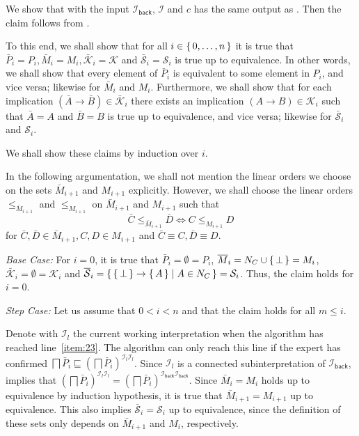 \begin{Proof}
  We show that  with the input
  $\mathcal{I}_{\mathsf{back}}$, $\mathcal{I}$ and $c$ has the same output as
  .  Then the claim follows from
  .

  To this end, we shall show that for all $i \in {\ensuremath{\{\, 0, \dots, n \,\}}}$ it is true that
  $\bar P_{i} = P_{i}, \bar M_{i} = M_{i}, \bar{\mathcal{K}}_{i} = \mathcal{K}$ and
  $\bar{\mathcal{S}}_{i} = \mathcal{S}_{i}$ is true up to equivalence.  In other words, we
  shall show that every element of $\bar P_{i}$ is equivalent to some element in $P_{i}$,
  and vice versa; likewise for $\bar M_{i}$ and $M_{i}$.  Furthermore, we shall show that
  for each implication $(\bar A \to \bar B) \in \bar{\mathcal{K}}_{i}$ there exists an
  implication $(A \to B) \in \mathcal{K}_{i}$ such that $\bar A = A$ and $\bar B = B$ is
  true up to equivalence, and vice versa; likewise for $\bar{\mathcal{S}}_{i}$ and
  $\mathcal{S}_{i}$.

  We shall show these claims by induction over $i$.

  In the following argumentation, we shall not mention the linear orders we choose on the
  sets $\bar M_{i+1}$ and $M_{i+1}$ explicitly.  However, we shall
  choose the linear orders $\leq_{\bar M_{i+1}}$ and $\leq_{M_{i+1}}$ on $\bar M_{i+1}$
  and $M_{i+1}$ such that
  \begin{equation*}
    \bar C \leq_{\bar M_{i+1}} \bar D \iff C \leq_{M_{i+1}} D
  \end{equation*}
  for $\bar C, \bar D \in \bar M_{i+1}, C, D \in M_{i+1}$ and $\bar C \equiv C, \bar D
  \equiv D$.

  \textit{Base Case: }  For $i = 0$, it is true that $\bar P_{i} = \emptyset = P_{i}$,
  $\overline M_{i} = N_{C} \cup {\ensuremath{\{\, \bot \,\}}} = M_{i}$, $\bar{\mathcal{K}}_{i} = \emptyset =
  \mathcal{K}_{i}$ and $\overline{\mathcal{S}}_{i} = {\{\, {\{\, \bot \,\}} \to {\ensuremath{\{\, A \,\}}} \mid A
    \in N_{C} \,\}} = \mathcal{S}_{i}$.  Thus, the claim holds for $i = 0$.

  \textit{Step Case: } Let us assume that $0 < i < n$ and that the claim holds for all $m
  \leq i$.

  Denote with $\mathcal{I}_{l}$ the current working interpretation when the algorithm has
  reached line~\ref{item:23}.  The algorithm can only reach this line if the expert has
  confirmed $\bigsqcap \bar P_{i} \sqsubseteq (\bigsqcap \bar
  P_{i})^{\mathcal{I}_{l}\mathcal{I}_{l}}$.  Since $\mathcal{I}_{l}$ is a connected
  subinterpretation of $\mathcal{I}_{\mathsf{back}}$,  implies that
  $(\bigsqcap \bar P_{i})^{\mathcal{I}_{l}\mathcal{I}_{l}} = (\bigsqcap \bar
  P_{i})^{\mathcal{I}_{\mathsf{back}}\mathcal{I}_{\mathsf{back}}}$.  Since $\bar M_{i} =
  M_{i}$ holds up to equivalence by induction hypothesis, it is true that $\bar M_{i+1} =
  M_{i+1}$ up to equivalence.  This also implies $\bar{\mathcal{S}}_{i} = \mathcal{S}_{i}$
  up to equivalence, since the definition of these sets only depends on $\bar M_{i+1}$ and
  $M_{i}$, respectively.


\end{Proof}
